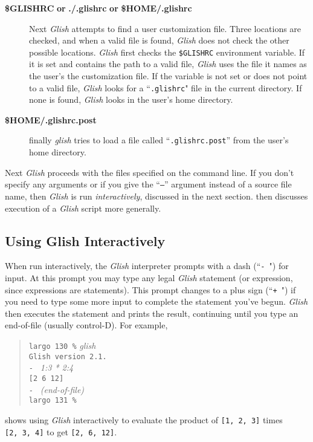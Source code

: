 \begin{sloppy}
\begin{description}
\item[{\bf \$GLISHRC} {\bf or} {\bf ./.glishrc} {\bf or} {\bf \$HOME/.glishrc}]
Next {\em Glish} attempts to find a user customization file. Three locations
are checked, and when a valid file is found, {\em Glish} does not check the
other possible locations. {\em Glish} first checks the
{\tt \$GLISHRC} environment variable. If it is set and contains the path
to a valid file, {\em Glish} uses the file it names as the user's
the customization file.  If the variable is not set or does not
point to a valid file, {\em Glish} looks
for a ``{\tt .glishrc}" file in the current directory. If none is found,
{\em Glish} looks in the user's home directory.

\item[{\bf \$HOME/.glishrc.post}]
finally {\em glish} tries to load a file called ``{\tt.glishrc.post}'' from the
user's home directory.
\end{description}

Next {\em Glish} proceeds with the files specified on the command line.
If you don't specify any arguments or if you give the ``{\tt --}'' argument
instead of a source file name, then {\em Glish} is run {\em interactively\/},
discussed in the next section.   then discusses
execution of a {\em Glish} script more generally.

\subsection{Using Glish Interactively}
\label{interactive-use}

When run interactively, the {\em Glish} interpreter
prompts with a dash (``{\tt - }") for input.  At this
prompt you may type any legal {\em Glish} statement (or expression, since
expressions are statements).  This prompt changes
to a plus sign (``{\tt + }")
if you need to type some more input to complete the statement you've
begun.  {\em Glish} then executes the statement and prints the result, continuing
until you type an end-of-file (usually control-D).  For example,
\begin{quote}
    {\tt largo 130 \%} {\em glish} \\
    {\tt Glish version 2.1.} \\
    {\tt - } {\em 1:3 * 2:4} \\
    {\tt [2 6 12]} \\
    {\tt - } {\em (end-of-file)} \\
    {\tt largo 131 \%}
\end{quote}
shows using {\em Glish} interactively to evaluate the product of {\tt [1, 2, 3]}
times {\tt [2,~3,~4]} to get {\tt [2, 6, 12]}.


\end{sloppy}
